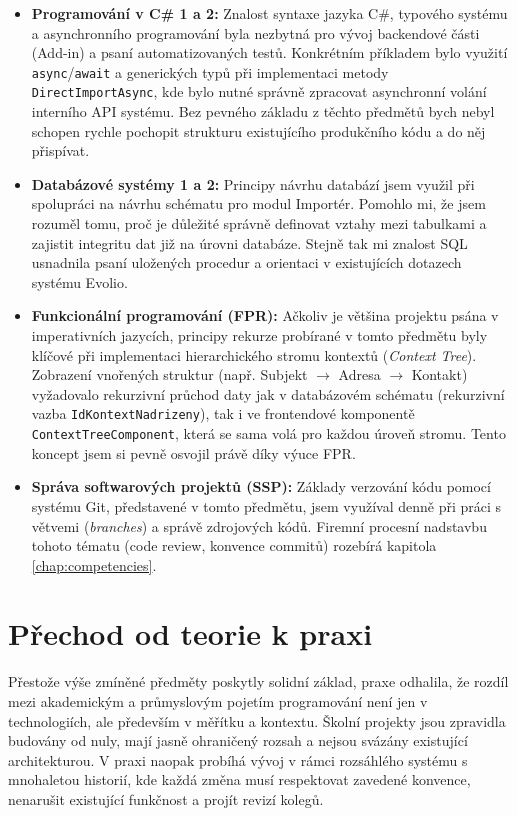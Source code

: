 \begin{itemize}
    \item \textbf{Programování v C\# 1 a 2:} Znalost syntaxe jazyka C\#, typového systému a asynchronního programování byla nezbytná pro vývoj backendové části (Add-in) a psaní automatizovaných testů. Konkrétním příkladem bylo využití \texttt{async}/\texttt{await} a generických typů při implementaci metody \texttt{DirectImportAsync}, kde bylo nutné správně zpracovat asynchronní volání interního API systému. Bez pevného základu z těchto předmětů bych nebyl schopen rychle pochopit strukturu existujícího produkčního kódu a do něj přispívat.

    \item \textbf{Databázové systémy 1 a 2:} Principy návrhu databází jsem využil při spolupráci na návrhu schématu pro modul Importér. Pomohlo mi, že jsem rozuměl tomu, proč je důležité správně definovat vztahy mezi tabulkami a zajistit integritu dat již na úrovni databáze. Stejně tak mi znalost SQL usnadnila psaní uložených procedur a orientaci v existujících dotazech systému Evolio.

    \item \textbf{Funkcionální programování (FPR):} Ačkoliv je většina projektu psána v imperativních jazycích, principy rekurze probírané v tomto předmětu byly klíčové při implementaci hierarchického stromu kontextů (\textit{Context Tree}). Zobrazení vnořených struktur (např. Subjekt $\rightarrow$ Adresa $\rightarrow$ Kontakt) vyžadovalo rekurzivní průchod daty jak v databázovém schématu (rekurzivní vazba \texttt{IdKontextNadrizeny}), tak i ve frontendové komponentě \texttt{ContextTreeComponent}, která se sama volá pro každou úroveň stromu. Tento koncept jsem si pevně osvojil právě díky výuce FPR.

    \item \textbf{Správa softwarových projektů (SSP):} Základy verzování kódu pomocí systému Git, představené v tomto předmětu, jsem využíval denně při práci s větvemi (\textit{branches}) a správě zdrojových kódů. Firemní procesní nadstavbu tohoto tématu (code review, konvence commitů) rozebírá kapitola \ref{chap:competencies}.
\end{itemize}

\section{Přechod od teorie k praxi}

Přestože výše zmíněné předměty poskytly solidní základ, praxe odhalila, že rozdíl mezi akademickým a průmyslovým pojetím programování není jen v technologiích, ale především v měřítku a kontextu. Školní projekty jsou zpravidla budovány od nuly, mají jasně ohraničený rozsah a nejsou svázány existující architekturou. V praxi naopak probíhá vývoj v rámci rozsáhlého systému s mnohaletou historií, kde každá změna musí respektovat zavedené konvence, nenarušit existující funkčnost a projít revizí kolegů.

